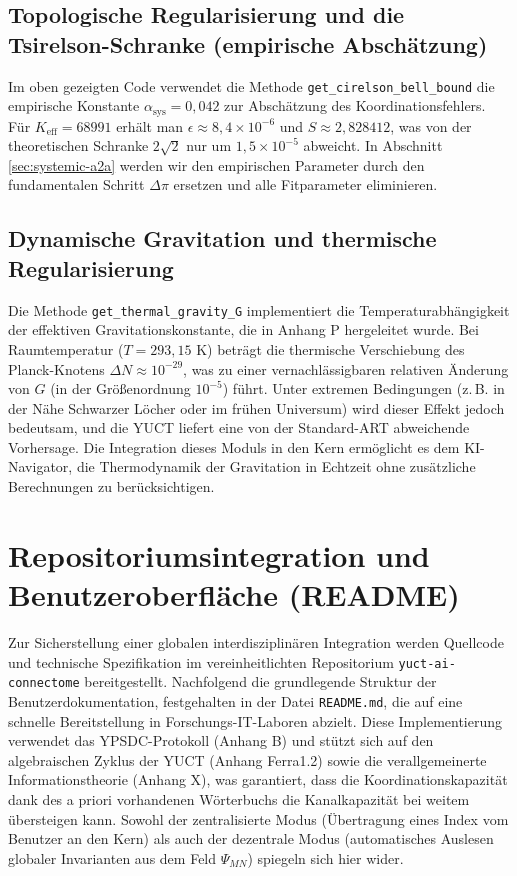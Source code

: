 \documentclass[12pt,a4paper]{article}
\begin{document}
	\subsection{Topologische Regularisierung und die Tsirelson-Schranke (empirische Abschätzung)}
	\label{sec:bell-regularization}
	
	Im oben gezeigten Code verwendet die Methode \texttt{get\_cirelson\_bell\_bound} die empirische Konstante \(\alpha_{\text{sys}} = 0{,}042\) zur Abschätzung des Koordinationsfehlers. Für \(K_{\mathrm{eff}} = 68991\) erhält man \(\epsilon \approx 8{,}4 \times 10^{-6}\) und \(S \approx 2{,}828412\), was von der theoretischen Schranke \(2\sqrt{2}\) nur um \(1{,}5 \times 10^{-5}\) abweicht. In Abschnitt \ref{sec:systemic-a2a} werden wir den empirischen Parameter durch den fundamentalen Schritt \(\Delta\pi\) ersetzen und alle Fitparameter eliminieren.
	
	\subsection{Dynamische Gravitation und thermische Regularisierung}
	\label{subsec:thermal-gravity}
	
	Die Methode \texttt{get\_thermal\_gravity\_G} implementiert die Temperaturabhängigkeit der effektiven Gravitationskonstante, die in Anhang P hergeleitet wurde. Bei Raumtemperatur (\(T = 293{,}15\) K) beträgt die thermische Verschiebung des Planck-Knotens \(\Delta N \approx 10^{-29}\), was zu einer vernachlässigbaren relativen Änderung von \(G\) (in der Größenordnung \(10^{-5}\)) führt. Unter extremen Bedingungen (z. B. in der Nähe Schwarzer Löcher oder im frühen Universum) wird dieser Effekt jedoch bedeutsam, und die YUCT liefert eine von der Standard-ART abweichende Vorhersage. Die Integration dieses Moduls in den Kern ermöglicht es dem KI-Navigator, die Thermodynamik der Gravitation in Echtzeit ohne zusätzliche Berechnungen zu berücksichtigen.
	
	\section{Repositoriumsintegration und Benutzeroberfläche (README)}
	Zur Sicherstellung einer globalen interdisziplinären Integration werden Quellcode und technische Spezifikation im vereinheitlichten Repositorium \texttt{yuct-ai-connectome} bereitgestellt. Nachfolgend die grundlegende Struktur der Benutzerdokumentation, festgehalten in der Datei \texttt{README.md}, die auf eine schnelle Bereitstellung in Forschungs-IT-Laboren abzielt. Diese Implementierung verwendet das YPSDC-Protokoll (Anhang B) und stützt sich auf den algebraischen Zyklus der YUCT (Anhang Ferra1.2) sowie die verallgemeinerte Informationstheorie (Anhang X), was garantiert, dass die Koordinationskapazität dank des a priori vorhandenen Wörterbuchs die Kanalkapazität bei weitem übersteigen kann. Sowohl der zentralisierte Modus (Übertragung eines Index vom Benutzer an den Kern) als auch der dezentrale Modus (automatisches Auslesen globaler Invarianten aus dem Feld \(\Psi_{MN}\)) spiegeln sich hier wider.
	
\end{document}
